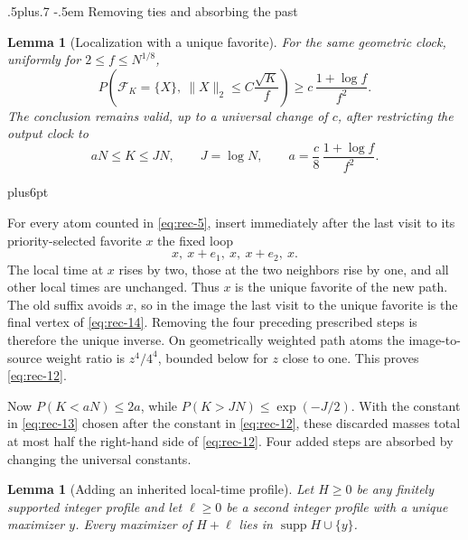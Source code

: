 \documentclass[12pt,reqno]{amsart}
\makeatletter
\def\subsection{\@startsection{subsection}{2}{0pt}%
  {.5\linespacing plus.7\linespacing}
  {-.5em}
  {\normalfont\scshape}}
\theoremstyle{plain}
\newtheorem{lemma}[theorem]{Lemma}
\theoremstyle{definition}
\theoremstyle{remark}
\renewenvironment{proof}[1][\proofname]{%
  \par
  \pushQED{\qed}%
  \normalfont
  \topsep6pt plus6pt\relax
  \trivlist
  \item[\hskip\labelsep\slshape #1\@addpunct{.}]%
  \ignorespaces
}{%
  \popQED
  \endtrivlist
  \@endpefalse
}
\DeclareRobustCommand{\qed}{%
  \leavevmode\unskip\penalty9999\hbox{}\nobreak
  \ifmmode
    \makebox[0pt][l]{\qquad\hbox{\qedsymbol}}%
  \else
    \qquad\hbox{\qedsymbol}%
  \fi
}
\renewcommand{\qedsymbol}{\rule[.47pt]{4pt}{6pt}}
\numberwithin{equation}{section}
\makeatother
\begin{document}
\subsection{Removing ties and absorbing the past}

\begin{lemma}[Localization with a unique favorite]\label{lem:singleton-geometric-localization}
For the same geometric clock, uniformly for \(2\le f\le N^{1/8}\),
\begin{equation}
P\left(\mathcal F_K=\{X\},\
        \lVert X\rVert_2\le C\frac{\sqrt K}{f}\right)
       \ge c\,\frac{1+\log f}{f^2}.                            \label{eq:rec-12}
\end{equation}
The conclusion remains valid, up to a universal change of \(c\), after
restricting the output clock to
\begin{equation}
aN\le K\le JN,\qquad J=\log N,\qquad
       a=\frac c8\,\frac{1+\log f}{f^2}.                       \label{eq:rec-13}
\end{equation}
\end{lemma}

\begin{proof}
For every atom counted in \eqref{eq:rec-5}, insert immediately after the last visit to
its priority-selected favorite \(x\) the fixed loop
\begin{equation}
x,\ x+e_1,\ x,\ x+e_2,\ x.                             \label{eq:rec-14}
\end{equation}
The local time at \(x\) rises by two, those at the two neighbors rise by
one, and all other local times are unchanged.  Thus \(x\) is the unique
favorite of the new path.  The old suffix avoids \(x\), so in the image the
last visit to the unique favorite is the final vertex of \eqref{eq:rec-14}.  Removing
the four preceding prescribed steps is therefore the unique inverse.  On
geometrically weighted path atoms the image-to-source weight ratio is
\(z^4/4^4\), bounded below for \(z\) close to one.  This proves \eqref{eq:rec-12}.

Now \(P(K<aN)\le2a\), while
\(P(K>JN)\le\exp(-J/2)\).  With the constant in \eqref{eq:rec-13} chosen after the
constant in \eqref{eq:rec-12}, these discarded masses total at most half the right-hand
side of \eqref{eq:rec-12}.  Four added steps are absorbed by changing the universal
constants.
\end{proof}

\begin{lemma}[Adding an inherited local-time profile]\label{lem:inherited-profile-dichotomy}
Let \(H\ge0\) be any finitely supported integer profile and let
\(\ell\ge0\) be a second integer profile with a unique maximizer \(y\).
Every maximizer of \(H+\ell\) lies in
\(\operatorname{supp}H\cup\{y\}\).
\end{lemma}
\end{document}
